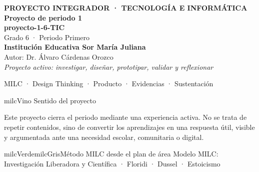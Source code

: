 \documentclass[11pt,letterpaper]{article}
\begin{document}
\thispagestyle{empty}

\vspace*{.85cm}
\begin{tcolorbox}[
  enhanced,colback=milcVino,colframe=milcVino,arc=12mm,width=.86\textwidth,
  boxrule=0pt,left=12mm,right=12mm,top=11mm,bottom=11mm,center,
  overlay={\draw[milcMagenta,line width=2pt,dash pattern=on 9pt off 8pt,rounded corners=10mm]
  ([xshift=7mm,yshift=-7mm]frame.north west) rectangle ([xshift=-7mm,yshift=7mm]frame.south east);}]
  \centering
  {\sffamily\bfseries\color{white}\fontsize{15}{17}\selectfont PROYECTO INTEGRADOR · TECNOLOGÍA E INFORMÁTICA}\\[1.0cm]
  {\sffamily\bfseries\color{white}\fontsize{30}{33}\selectfont Proyecto de periodo 1}\\[3mm]
  {\sffamily\bfseries\color{milcMostaza}\fontsize{25}{28}\selectfont proyecto-1-6-TIC}\\[8mm]
  {\sffamily\color{white}\Large Grado 6 · Periodo Primero}\\[1.0cm]
  {\sffamily\bfseries\color{white}\large Institución Educativa Sor María Juliana}\\[2mm]
  {\sffamily\color{white}Autor: Dr. Álvaro Cárdenas Orozco}\\[4mm]
  {\sffamily\itshape\color{white}Proyecto activo: investigar, diseñar, prototipar, validar y reflexionar}
\end{tcolorbox}
\vfill
\begin{tcolorbox}[enhanced,colback=milcVino!72!black,colframe=milcVino!72!black,arc=5mm,boxrule=0pt,width=.86\textwidth,left=6mm,right=6mm,top=4mm,bottom=4mm,center]
{\color{white}\sffamily\small MILC · Design Thinking · Producto · Evidencias · Sustentación}
\end{tcolorbox}

\newpage
\begin{titlebox}{milcVino}
Sentido del proyecto
\end{titlebox}
\begin{multicols}{2}
Este proyecto cierra el periodo mediante una experiencia activa. No se trata de repetir contenidos, sino de convertir los aprendizajes en una respuesta útil, visible y argumentada ante una necesidad escolar, comunitaria o digital.

\columnbreak
\begin{softbox}{milcVerde}{milcGris}{Método MILC desde el plan de área}
Modelo MILC: Investigación Liberadora y Científica · Floridi · Dussel · Estoicismo
\end{softbox}
\end{multicols}
\end{document}
